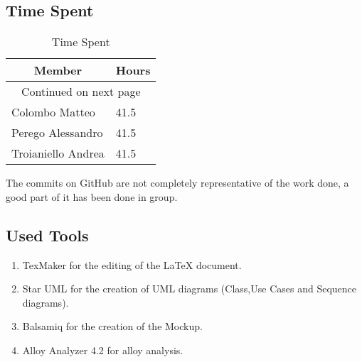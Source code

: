 \subsection{Time Spent}

\begin{center}
\begin{longtable}{|p{8cm} | p{5cm}|}
\hline \multicolumn{1}{|c|}{\textbf{Member}} & \multicolumn{1}{c|}{\textbf{Hours}} \\ \hline 
\endfirsthead
\hline
\endhead
\hline \multicolumn{2}{c}{{Continued on next page}} \\
\endfoot
\hline
\caption{Time Spent}
\label{ref:timespent}
\endlastfoot
Colombo Matteo & 41.5 \\
\hline 
Perego Alessandro & 41.5 \\ 
\hline
Troianiello Andrea & 41.5 \\
\end{longtable}
\end{center}
The commits on GitHub are not completely representative of the work done, a good part of it has been done in group.

\subsection{Used Tools}

\begin{enumerate}
\item
TexMaker for the editing of the LaTeX document.
\item
Star UML for the creation of UML diagrams (Class,Use Cases and Sequence diagrams).
\item
Balsamiq for the creation of the Mockup.
\item
Alloy Analyzer 4.2 for alloy analysis.
\end{enumerate}